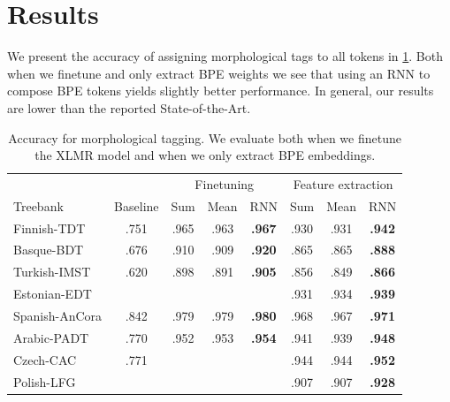 \documentclass[11pt]{article}
\begin{document}
	
	\section{Results}
	\label{results}
	
	
	
	We present the accuracy of assigning morphological tags to all tokens in \cref{tab:results_tokens}. Both when we finetune and only extract BPE weights we see that using an RNN to compose BPE tokens yields slightly better performance.
	In general, our results are lower than the reported State-of-the-Art.
	

	\begin{table}[h]
	\centering
	\begin{tabular}{l|c|ccc|ccc}
		& & \multicolumn{3}{c}{Finetuning} & \multicolumn{3}{c}{Feature extraction} \\
		Treebank & Baseline & Sum & Mean & RNN & Sum & Mean & RNN \\
		\hline
		Finnish-TDT & .751 & .965 & .963 & \textbf{.967} & .930 & .931 & \textbf{.942} \\ 
		Basque-BDT & .676 & .910 & .909 & \textbf{.920} & .865 & .865 & \textbf{.888} \\
		Turkish-IMST & .620 & .898 & .891 & \textbf{.905} & .856 & .849 & \textbf{.866}\\
		Estonian-EDT & & & & & .931 & .934 & \textbf{.939} \\
		Spanish-AnCora & .842 & .979 & .979 & \textbf{.980} & .968 & .967 & \textbf{.971} \\
		Arabic-PADT & .770 & .952 & .953&\textbf{.954} & .941 & .939 & \textbf{.948} \\
		Czech-CAC & .771 &  &  &  & .944 & .944 & \textbf{.952} \\
		Polish-LFG & & & &  & .907 & .907 & \textbf{.928} \\
	\end{tabular}
	\caption{\label{tab:results_tokens} Accuracy for morphological tagging. We evaluate both when we finetune the XLMR model and when we only extract BPE embeddings.}
	\end{table}
\end{document}
